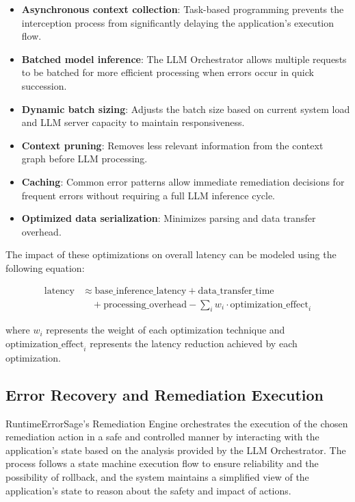 \begin{itemize}
\item \textbf{Asynchronous context collection}: Task-based programming prevents the interception process from significantly delaying the application's execution flow.
\item \textbf{Batched model inference}: The LLM Orchestrator allows multiple requests to be batched for more efficient processing when errors occur in quick succession.
\item \textbf{Dynamic batch sizing}: Adjusts the batch size based on current system load and LLM server capacity to maintain responsiveness.
\item \textbf{Context pruning}: Removes less relevant information from the context graph before LLM processing.
\item \textbf{Caching}: Common error patterns allow immediate remediation decisions for frequent errors without requiring a full LLM inference cycle.
\item \textbf{Optimized data serialization}: Minimizes parsing and data transfer overhead.
\end{itemize}

The impact of these optimizations on overall latency can be modeled using the following equation:

\begin{equation}
\begin{split}
\text{latency} &\approx \text{base\_inference\_latency} + \text{data\_transfer\_time} \\
&\quad + \text{processing\_overhead} - \sum_{i} w_i \cdot \text{optimization\_effect}_i
\end{split}
\end{equation}

where $w_i$ represents the weight of each optimization technique and $\text{optimization\_effect}_i$ represents the latency reduction achieved by each optimization.

\subsection{Error Recovery and Remediation Execution}
RuntimeErrorSage's Remediation Engine orchestrates the execution of the chosen remediation action in a safe and controlled manner by interacting with the application's state based on the analysis provided by the LLM Orchestrator. The process follows a state machine execution flow to ensure reliability and the possibility of rollback, and the system maintains a simplified view of the application's state to reason about the safety and impact of actions.

